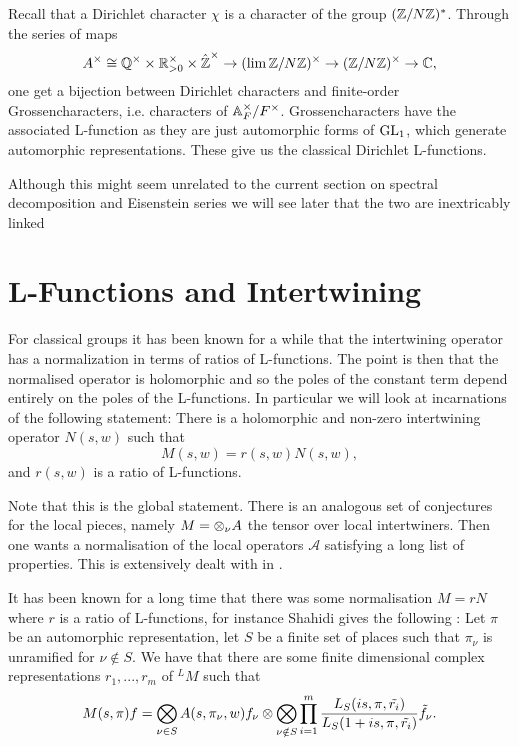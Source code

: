 \begin{example}
    Recall that a Dirichlet character \(\chi\) is a character of the group \((\Z/N\Z)^*\). Through the series of maps 
    \[A^\times \cong \Q^\times \times \R_{>0}^\times \times \hat{\Z}^\times \to (\lim \Z/N\Z)^\times \to (\Z/N\Z)^\times \to \C,\]
    one get a bijection between Dirichlet characters and finite-order Grossencharacters, i.e. characters of \(\A_F^\times/F^\times\).
    Grossencharacters have the associated L-function as they are just automorphic forms of \(\operatorname{GL}_1\), which generate automorphic representations. These give us the classical Dirichlet L-functions.
\end{example}
Although this might seem unrelated to the current section on spectral decomposition and Eisenstein series we will see later that the two are inextricably linked

\section{L-Functions and Intertwining}\label{L_inter}
For classical groups it has been known for a while that the intertwining operator has a normalization in terms of ratios of L-functions. The point is then that the normalised operator is holomorphic and so the poles of the constant term depend entirely on the poles of the L-functions. In particular we will look at incarnations of the following statement: There is a holomorphic and non-zero intertwining operator \(N(s, w)\) such that 
    \[M(s, w) = r(s, w)N(s,w),\]
    and \(r(s, w)\) is a ratio of L-functions.

    Note that this is the global statement. There is an analogous set of conjectures for the local pieces, namely \(M = \otimes_\nu A\) the tensor over local intertwiners. Then one wants a normalisation of the local operators \(\mathscr{A}\) satisfying a long list of properties. This is extensively dealt with in \cite{shahidiProofLanglandsConjecture1990}.


    It has been known for a long time that there was some normalisation \(M = rN\) where \(r\) is a ratio of L-functions, for instance Shahidi gives the following \cite{shahidiRamanujanConjectureFiniteness1988}: Let \(\pi\) be an automorphic representation, let \(S\) be a finite set of places such that \(\pi_\nu\) is unramified for \(\nu\notin S\). We have that there are some finite dimensional complex representations \(r_1, ..., r_m\) of \(^LM\) such that 
     \[M(s, \pi)f = \bigotimes_{\nu\in S}A(s, \pi_\nu, w)f_\nu \otimes \bigotimes_{\nu\notin S} \prod_{i=1}^{m}\frac{L_S(is, \pi, \tilde{r_i})}{L_S(1+is, \pi, \tilde{r_i})} \tilde{f}_\nu.\]

